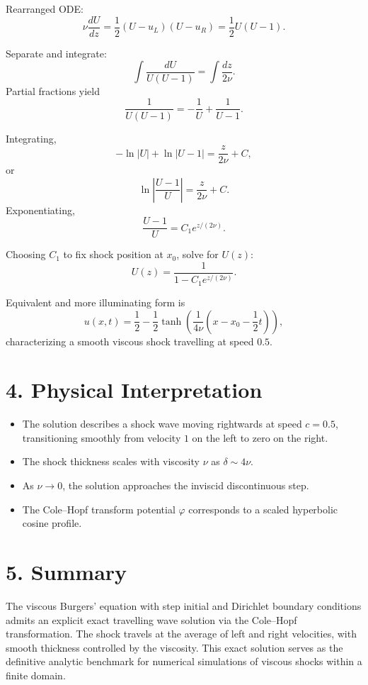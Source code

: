 \documentclass[12pt]{article}
\begin{document}
Rearranged ODE:
\[
\nu \frac{dU}{dz} = \frac{1}{2} (U - u_L)(U - u_R) = \frac{1}{2} U (U - 1).
\]

Separate and integrate:
\[
\int \frac{dU}{U(U - 1)} = \int \frac{dz}{2 \nu}.
\]
Partial fractions yield
\[
\frac{1}{U(U-1)} = -\frac{1}{U} + \frac{1}{U - 1}.
\]

Integrating,
\[
- \ln|U| + \ln|U - 1| = \frac{z}{2 \nu} + C,
\]
or
\[
\ln\left| \frac{U - 1}{U} \right| = \frac{z}{2 \nu} + C.
\]
Exponentiating,
\[
\frac{U - 1}{U} = C_1 e^{z/(2 \nu)}.
\]

Choosing \(C_1\) to fix shock position at \(x_0\), solve for \(U(z)\):
\[
U(z) = \frac{1}{1 - C_1 e^{z/(2 \nu)}}.
\]

Equivalent and more illuminating form is
\[
\boxed{
u(x,t) = \frac{1}{2} - \frac{1}{2} \tanh\left( \frac{1}{4 \nu} \left( x - x_0 - \frac{1}{2} t \right) \right),
}
\]
characterizing a smooth viscous shock travelling at speed \(0.5\).

\vspace{20pt}

\section*{4. Physical Interpretation}

\begin{itemize}
  \item The solution describes a shock wave moving rightwards at speed \(c=0.5\), transitioning smoothly from velocity \(1\) on the left to zero on the right.
  \item The shock thickness scales with viscosity \(\nu\) as \(\delta \sim 4 \nu\).
  \item As \(\nu \to 0\), the solution approaches the inviscid discontinuous step.
  \item The Cole--Hopf transform potential \(\varphi\) corresponds to a scaled hyperbolic cosine profile.
\end{itemize}

\vspace{20pt}

\section*{5. Summary}

The viscous Burgers' equation with step initial and Dirichlet boundary conditions admits an explicit exact travelling wave solution via the Cole--Hopf transformation. The shock travels at the average of left and right velocities, with smooth thickness controlled by the viscosity. This exact solution serves as the definitive analytic benchmark for numerical simulations of viscous shocks within a finite domain.

\vspace{20pt}
\end{document}

